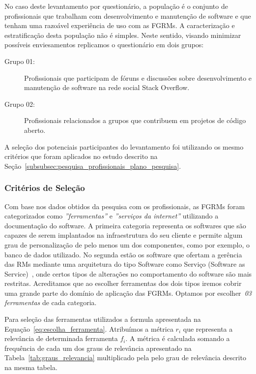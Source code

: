 No caso deste levantamento por questionário, a população é o conjunto de
profissionais que trabalham com desenvolvimento e manutenção de software e que
tenham uma razoável experiência de uso com as FGRMs. A caracterização e
estratificação desta população não é simples. Neste sentido, visando minimizar
possíveis enviesamentos replicamos o questionário em dois grupos:

\begin{description}
	\item[Grupo 01:] Profissionais que participam de fóruns e discussões sobre
		desenvolvimento e manutenção de software na rede social Stack Overflow.
	\item[Grupo 02:] Profissionais relacionados a grupos que contribuem em
		projetos de código aberto.
\end{description}

A seleção dos potenciais participantes do levantamento foi utilizando os mesmo
critérios que foram aplicados no estudo descrito na
Seção~\ref{subsubsec:pesquisa_profissionais_plano_pesquisa}.

\subsubsection{Critérios de Seleção}
\label{ssub:metodologia_criterios_selecao}

Com base nos dados obtidos da pesquisa com os profissionais, as FGRMs foram
categorizados como \textit{''ferramentas''} e \textit{''serviços da internet''}
utilizando a documentação do software. A primeira categoria representa os
softwares que são capazes de serem implantados na infraestrutura do seu cliente
e permite algum grau de personalização de pelo menos um dos componentes, como
por exemplo, o banco de dados utilizado. No segunda estão os software que
ofertam a gerência das RMs mediante uma arquitetura do tipo Software como
Serviço (Software as Service)~\cite{fox2013engineering}, onde certos tipos de
alterações no comportamento do software são mais restritas. Acreditamos que ao
escolher ferramentas dos dois tipos iremos cobrir uma grande parte do domínio de
aplicação das FGRMs. Optamos por escolher~\textit{03 ferramentas} de cada
categoria.

Para seleção das ferramentas utilizados a formula apresentada na
Equação~\ref{eq:escolha_ferramenta}. Atribuímos a métrica $r_i$ que representa a
relevância de determinada ferramenta $f_i$. A métrica é calculada somando a
frequência de cada um dos graus de relevância apresentado na
Tabela~\ref{tab:graus_relevancia} multiplicado pela pelo grau de relevância
descrito na mesma tabela.

